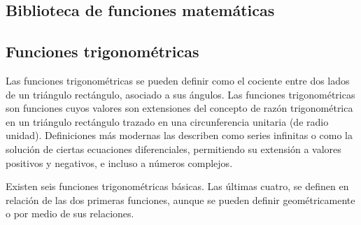 \subsection{Biblioteca de funciones matemáticas}


\subsection{Funciones trigonométricas}
Las funciones trigonométricas se pueden definir como el cociente entre dos lados de un triángulo rectángulo, asociado a sus ángulos. Las funciones trigonométricas son funciones cuyos valores son extensiones del concepto de razón trigonométrica en un triángulo rectángulo trazado en una circunferencia unitaria (de radio unidad). Definiciones más modernas las describen como series infinitas o como la solución de ciertas ecuaciones diferenciales, permitiendo su extensión a valores positivos y negativos, e incluso a números complejos. 

Existen seis funciones trigonométricas básicas. Las últimas cuatro, se definen en relación de las dos primeras funciones, aunque se pueden definir geométricamente o por medio de sus relaciones. 